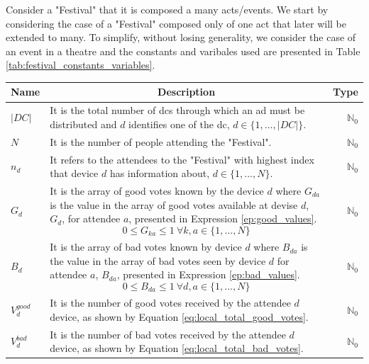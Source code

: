 Consider a "Festival" that it is composed a many acts/events. We start by considering the case of a "Festival" composed only of one act that later will be extended to many. To simplify, without losing generality, we consider the case of an event in a theatre and the constants and varibales used are presented in Table \ref{tab:festival_constants_variables}.
\begin{table}[!ht]
	\begin{tabular}{|p{.5cm}|p{5.7cm}|r| }
		\hline
		\multicolumn{1}{|c|}{Name} & \multicolumn{1}{c|}{Description} & \multicolumn{1}{c|}{Type} \\
		\hline
		\hline
			$|DC|$ & It is the total number of \glspl{dc} through which an ad must be distributed and $d$ identifies one of the \gls{dc}, $d \in \{1,\dots, |DC|\}$. & $\mathbb{N}_{0}$ \\
		\hline
			$N$ & It is the number of people attending the "Festival". & $\mathbb{N}_{0}$ \\
		\hline
			$n_{d}$ & It refers to the attendees to the "Festival" with highest index that device $d$ has information about,  $d \in \{1,\dots, N\}$. & $\mathbb{N}_{0}$ \\
		\hline
			$G_{d}$ & It is the array of good votes known by the device $d$ where $G_{da}$ is the value in the array of good votes available at devise $d$, $G_{d}$, for attendee $a$, presented in Expression \ref{ep:good_values}.
				\begin{equation} \label{ep:good_values}
					0 \le G_{ka} \le 1 ~ \forall k,a \in \{1,\dots, N\}
				\end{equation} & 
			$\mathbb{N}_{0}$ \\
		\hline
			$B_{d}$ & It is the array of bad votes known by device $d$ where $B_{da}$ is the value in the array of bad votes seen by device $d$ for attendee $a$, $B_{da}$, presented in Expression \ref{ep:bad_values}.
				\begin{equation} \label{ep:bad_values}
					0 \le B_{da} \le 1 ~ \forall d, a \in \{1,\dots, N\}
				\end{equation} & 
			$\mathbb{N}_{0}$ \\
		\hline
			$V^{good}_{d}$ & It is the number of good votes received by the attendee $d$ device, as shown by Equation \ref{eq:local_total_good_votes}. & $\mathbb{N}_{0}$ \\
		\hline
			$V^{bad}_{d}$ & It is the number of bad votes received by the attendee $d$ device, as shown by Equation \ref{eq:local_total_bad_votes}. & $\mathbb{N}_{0}$ \\

\end{tabular}
\end{table}
